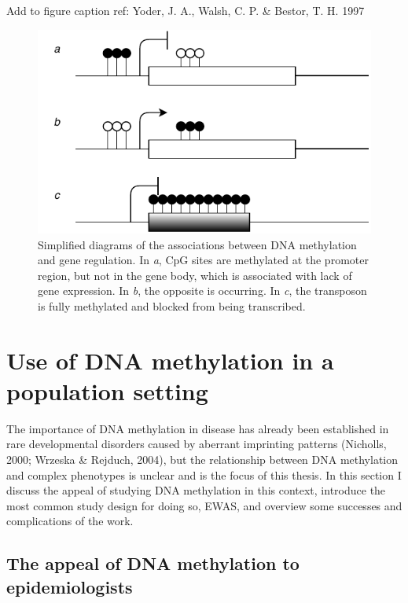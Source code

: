 \documentclass[11pt,twoside]{bristolthesis}
\begin{document}
Add to figure caption ref: Yoder, J. A., Walsh, C. P. \& Bestor, T. H. 1997
\begin{figure}
\centering
\includegraphics{figure/01-introduction/dnam-gene-expression.pdf}
\caption{\label{fig:dnam-functions}Simplified diagrams of the associations between DNA methylation and gene regulation. In \emph{a}, CpG sites are methylated at the promoter region, but not in the gene body, which is associated with lack of gene expression. In \emph{b}, the opposite is occurring. In \emph{c}, the transposon is fully methylated and blocked from being transcribed.}
\end{figure}
\hypertarget{dnam-phs}{%
\section{Use of DNA methylation in a population setting~}\label{dnam-phs}}

The importance of DNA methylation in disease has already been established in rare developmental disorders caused by aberrant imprinting patterns (Nicholls, 2000; Wrzeska \& Rejduch, 2004), but the relationship between DNA methylation and complex phenotypes is unclear and is the focus of this thesis. In this section I discuss the appeal of studying DNA methylation in this context, introduce the most common study design for doing so, EWAS, and overview some successes and complications of the work.

\hypertarget{appeal-of-dnam}{%
\subsection{The appeal of DNA methylation to epidemiologists}\label{appeal-of-dnam}}
\end{document}
